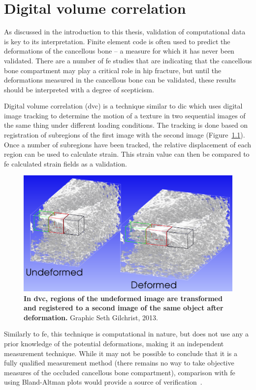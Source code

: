 
\chapter{Digital volume correlation}
\label{ch:dvc}
As discussed in the introduction to this thesis, validation of computational data is key to its interpretation.
Finite element code is often used to predict the deformations of the cancellous bone -- a measure for which it has never been validated.
There are a number of \ac{fe} studies that are indicating that the cancellous bone compartment may play a critical role in hip fracture, but until the deformations measured in the cancellous bone can be validated, these results should be interpreted with a degree of scepticism.

Digital volume correlation (\acs{dvc}) is a technique similar to \acf{dic} which uses digital image tracking to determine the motion of a texture in two sequential images of the same thing under different loading conditions.
The tracking is done based on registration of subregions of the first image with the second image (Figure~\ref{fig:DVC_how}).
Once a number of subregions have been tracked, the relative displacement of each region can be used to calculate strain.
This strain value can then be compared to \ac{fe} calculated strain fields as a validation.

\begin{figure}
\centering
\includegraphics[width=0.7\linewidth]{./appendixDvc/figures/DVC_how}
\caption[Illustration of the \acs*{dvc} method]{\textbf{In \acs{dvc}, regions of the undeformed image are transformed and registered to a second image of the same object after deformation.} Graphic \textcopyright Seth Gilchrist, 2013.}
\label{fig:DVC_how}
\end{figure}

Similarly to \ac{fe}, this technique is computational in nature, but does not use any a prior knowledge of the potential deformations, making it an independent measurement technique.
While it may not be possible to conclude that it is a fully qualified measurement method (there remains no way to take objective measures of the occluded cancellous bone compartment), comparison with \ac{fe} using Bland-Altman plots would provide a source of verification~\citep{schlesinger_terminology_1979}.


